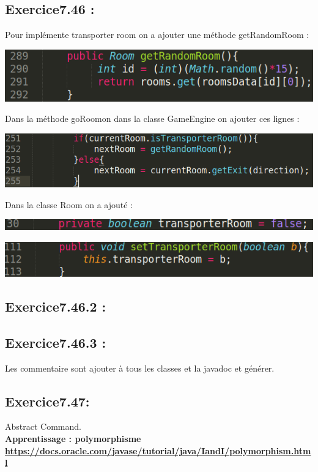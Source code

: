 \documentclass[french,10pt,a4paper]{report}
\begin{document}
\subsection{\textcolor{bb}{Exercice7.46 :}}
Pour implémente transporter room on a ajouter une méthode getRandomRoom :
\begin{center}
	\includegraphics[scale=0.5]{captures/it4_5.png}
\end{center}
Dans la méthode goRoomon dans  la classe GameEngine on ajouter ces lignes :
\begin{center}
	\includegraphics[scale=0.4]{captures/it4_6.png}
\end{center}
Dans la classe Room on a ajouté : 
\begin{center}
	\includegraphics[scale=0.5]{captures/it4_7.png}
\end{center}
\begin{center}
	\includegraphics[scale=0.49]{captures/it4_8.png}
\end{center}

\subsection{\textcolor{bb}{Exercice7.46.2 :}}

\subsection{\textcolor{bb}{Exercice7.46.3 :}}
Les commentaire sont ajouter à tous les classes et la javadoc et générer.


\subsection{\textcolor{bb}{Exercice7.47:}}
Abstract Command.\\
\textbf{\textcolor{gg}{Apprentissage : polymorphisme}\\
\textcolor{bb}{\href{https://docs.oracle.com/javase/tutorial/java/IandI/polymorphism.html}{https://docs.oracle.com/javase/tutorial/java/IandI/polymorphism.html}}}
\end{document}
